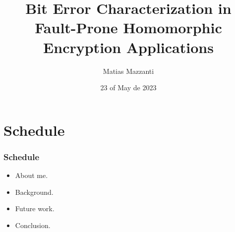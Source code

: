 \documentclass[10pt,handout]{beamer}
\title[]{Bit Error Characterization in Fault-Prone Homomorphic Encryption Applications}
\author[Matias Mazzanti]{Matias Mazzanti}
\institute{}
\date{23 of May de 2023}
\begin{document}
\begin{frame}

\maketitle

\end{frame}


\section{Schedule}
\begin{frame}
    \frametitle{Schedule}
    \begin{itemize}
        \item About me.
        \item Background.
        \item Future work.
        \item Conclusion.
    \end{itemize}
\end{frame}
\end{document}
